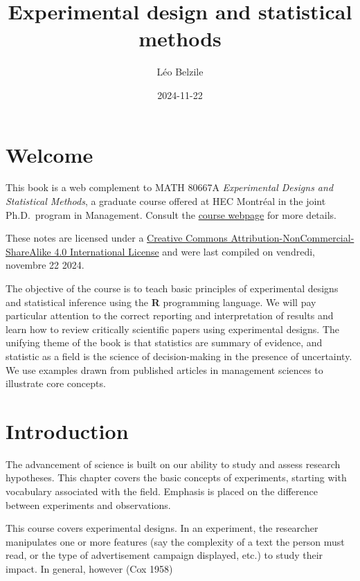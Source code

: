 \documentclass[
  11pt,
  letterpaper,
]{scrbook}
\title{Experimental design and statistical methods}
\author{Léo Belzile}
\date{2024-11-22}
\renewcommand*\contentsname{Table of contents}
\newcommand\contentsname{Table of contents}
\theoremstyle{definition}
\theoremstyle{definition}
\theoremstyle{remark}
\begin{document}


\renewcommand*\contentsname{Table of contents}
{
\setcounter{tocdepth}{2}
\tableofcontents
}

\mainmatter
{}

\chapter*{Welcome}\label{welcome}


This book is a web complement to MATH 80667A \emph{Experimental Designs
and Statistical Methods}, a graduate course offered at HEC Montréal in
the joint Ph.D.~program in Management. Consult the
\href{https://lbelzile.github.io/experimental}{course webpage} for more
details.

These notes are licensed under a
\href{http://creativecommons.org/licenses/by-nc-sa/4.0/}{Creative
Commons Attribution-NonCommercial-ShareAlike 4.0 International License}
and were last compiled on vendredi, novembre 22 2024.

The objective of the course is to teach basic principles of experimental
designs and statistical inference using the \textbf{R} programming
language. We will pay particular attention to the correct reporting and
interpretation of results and learn how to review critically scientific
papers using experimental designs. The unifying theme of the book is
that statistics are summary of evidence, and statistic as a field is the
science of decision-making in the presence of uncertainty. We use
examples drawn from published articles in management sciences to
illustrate core concepts.


\chapter{Introduction}\label{introduction}

The advancement of science is built on our ability to study and assess
research hypotheses. This chapter covers the basic concepts of
experiments, starting with vocabulary associated with the field.
Emphasis is placed on the difference between experiments and
observations.

This course covers experimental designs. In an experiment, the
researcher manipulates one or more features (say the complexity of a
text the person must read, or the type of advertisement campaign
displayed, etc.) to study their impact. In general, however (Cox 1958)
\end{document}
